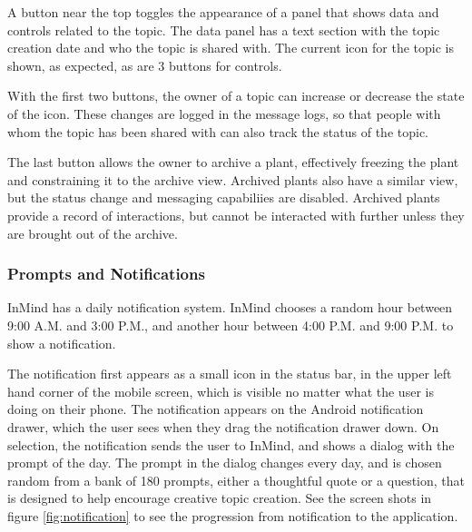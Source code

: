       A button near the top toggles the appearance of a panel that shows data and controls
      related to the topic.
      The data panel has a text section with the topic creation date and who the topic is shared with.
      The current icon for the topic is shown, as expected, as are 3 buttons for controls.

      With the first two buttons,
      the owner of a topic can increase or decrease the state of the icon.
      These changes are logged in the message logs,
      so that people with whom the topic has been shared with
      can also track the status of the topic.

      The last button allows the owner to archive a plant,
      effectively freezing the plant and constraining it to the archive view.
      Archived plants also have a similar view,
      but the status change and messaging capabiliies are disabled.
      Archived plants provide a record of interactions,
      but cannot be interacted with further unless they are brought out of the archive.

      \subsubsection{Prompts and Notifications}
      InMind has a daily notification system.
      InMind chooses a random hour between 9:00 A.M. and 3:00 P.M.,
      and another hour between 4:00 P.M. and 9:00 P.M. to show a notification.

      The notification first appears as a small icon in the status bar,
      in the upper left hand corner of
      the mobile screen, which is visible no matter what the user is doing on their phone.
      The notification appears on the Android notification drawer,
      which the user sees when they drag the notification drawer down.
      On selection,
      the notification sends the user to InMind,
      and shows a dialog with the prompt of the day.
      The prompt in the dialog changes every day,
      and is chosen random from a bank of 180 prompts,
      either a thoughtful quote or a question,
      that is designed to help encourage creative topic creation.
      See the screen shots in figure \ref{fig:notification} to see the progression
      from notification to the application.

